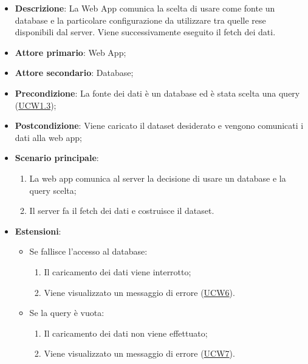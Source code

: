 \begin{itemize}

	\item \textbf{Descrizione}: La Web App comunica la scelta di usare come fonte un database e la particolare configurazione da utilizzare tra quelle 
	rese disponibili dal server. Viene successivamente eseguito il fetch dei dati.
	
    \item \textbf{Attore primario}: Web App;
	\item \textbf{Attore secondario}: Database;
	        
    \item \textbf{Precondizione}:   La fonte dei dati è un database ed è stata scelta una query (\hyperref[ssub:ucw1.3]{UCW1.3});

    \item \textbf{Postcondizione}:  Viene caricato il dataset desiderato e vengono comunicati i dati alla web app;

	\item \textbf{Scenario principale}:
		\begin{enumerate}
			\item La web app comunica al server la decisione di usare un database e la query scelta;
            \item Il server fa il fetch dei dati e costruisce il dataset.
        \end{enumerate}
		
	\item \textbf{Estensioni}:
		\begin{itemize}
		
			\item Se fallisce l'accesso al database:
			\begin{enumerate}
				
				\item Il caricamento dei dati viene interrotto;
				\item Viene visualizzato un messaggio di errore (\hyperref[sub:ucw6]{UCW6}).
				
			\end{enumerate}
		
			\item Se la query è vuota:
			\begin{enumerate}
				
				\item Il caricamento dei dati non viene effettuato;
				\item Viene visualizzato un messaggio di errore (\hyperref[sub:ucw7]{UCW7}).
				
			\end{enumerate}
		
		\end{itemize}
			
\end{itemize}